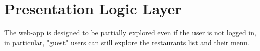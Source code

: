 
\section{Presentation Logic Layer}

The web-app is designed to be partially explored even if the user is not logged in, in particular, "guest" users can still explore the restaurants list and their menu.






